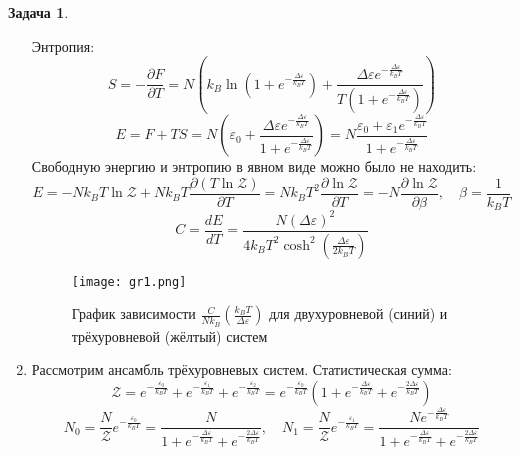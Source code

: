 \documentclass[12pt]{article}
\theoremstyle{definition}
\newtheorem{zad}{Задача}[section]
\begin{document}
\begin{zad}
\begin{enumerate}
\begin{equation}
    \end{equation}
    Энтропия:
    \begin{equation}
        S=-\frac{\partial F}{\partial     T}=N\left(k_B\ln\left(1+e^{-\frac{\Delta\varepsilon}{k_BT}}\right)+\frac{\Delta\varepsilon     e^{-\frac{\Delta\varepsilon}{k_BT}}}{T\left(1+e^{-\frac{\Delta\varepsilon}{k_BT}}\right)}\right)
    \end{equation}
    \begin{equation}
        E=F+TS=N\left(\varepsilon_0+\frac{\Delta\varepsilon     e^{-\frac{\Delta\varepsilon}{k_BT}}}{1+e^{-\frac{\Delta\varepsilon}{k_BT}}}\right)=N\frac{\varepsilon_0+\varepsilon_1e^{-\frac{\Delta\varepsilon}{k_BT}}}{1+e^{-\frac{\Delta\varepsilon}{k_BT}}}
    \end{equation}
    Свободную энергию и энтропию в явном виде можно было не находить:
    \begin{equation}
        E=-Nk_BT\ln\mathcal{Z}+Nk_BT\frac{\partial     (T\ln\mathcal{Z})}{\partial     T}=Nk_BT^2\frac{\partial\ln\mathcal{Z}}{\partial     T}=-N\frac{\partial\ln\mathcal{Z}}{\partial\beta},\quad\beta=\frac{1}{k_BT}
    \end{equation}
    \begin{equation}
        \boxed{C=\frac{dE}{dT}=\frac{N(\Delta\varepsilon)^2}{4k_BT^2\cosh^2{\left(\frac{\Delta\varepsilon}{2k_BT}\right)}}}
    \end{equation}
    \begin{figure}
    \centering
    \texttt{[image: gr1.png]}
    \caption{График зависимости $\frac{C}{Nk_B}\left(\frac{k_BT}{\Delta\varepsilon}\right)$ для двухуровневой (синий) и трёхуровневой (жёлтый) систем}
    \label{gr1}
\end{figure}
    \item Рассмотрим ансамбль трёхуровневых систем. Статистическая сумма:
    \begin{equation}
        \mathcal{Z}=e^{-\frac{\varepsilon_0}{k_BT}}+e^{-\frac{\varepsilon_1}{k_BT}}+e^{-\frac{\varepsilon_2}{k_BT}}=e^{-\frac{\varepsilon_0    }{k_BT}}\left(1+e^{-\frac{\Delta\varepsilon}{k_BT}}+e^{-\frac{2\Delta\varepsilon}{k_BT}}\right)
    \end{equation}
    \begin{equation}
        N_0=\frac{N}{\mathcal{Z}}e^{-\frac{\varepsilon_0}{k_BT}}=\frac{N}{1+e^{-\frac{\Delta\varepsilon}{k_BT}}+e^{-\frac{2\Delta\varepsilon}{k_BT}}},\quad     N_1=\frac{N}{\mathcal{Z}}e^{-\frac{\varepsilon_1}{k_BT}}=\frac{Ne^{-\frac{\Delta\varepsilon}{k_BT}}}{1+e^{-\frac{\Delta\varepsilon}{k_BT}}+e^{-\frac{2\Delta\varepsilon}{k_BT}}}

\end{equation}
\end{enumerate}
\end{zad}
\end{document}
